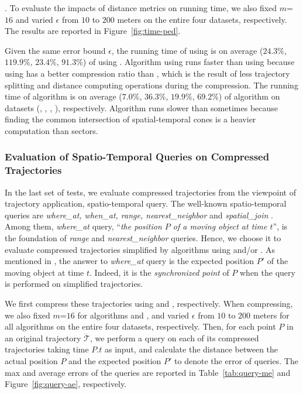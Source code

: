 {.
To evaluate the impacts of distance metrics on running time, we also fixed {$m$=$16$} and varied $\epsilon$ from $10$ to $200$ meters on the entire four datasets, respectively.
The results are reported in Figure~\ref{fig:time-ped}.

Given the same error bound $\epsilon$, the running time of \dpa  using \ped is on average
($24.3\%$, $119.9\%$, $23.4\%$, $91.3\%$) of \dpa  using \sed.
{Algorithm \dpa using \ped runs faster than using \sed because \dpa using \ped has a better compression ratio than \sed, which is the result of less trajectory splitting and distance computing operations during the compression.}
%
The running time of algorithm  is on average ($7.0\%$, $36.3\%$, $19.9\%$, $69.2\%$)
of algorithm \cist on datasets (\sercar, \geolife, \mopsi, \pricar), respectively.
{Algorithm \cist runs slower than  sometimes because
finding the common intersection of spatial-temporal cones is a heavier computation than sectors.
}


\subsubsection{{Evaluation of Spatio-Temporal Queries on Compressed Trajectories}}
{In the last set of tests, we evaluate compressed trajectories from the viewpoint of trajectory application, \ie spatio-temporal query. The well-known spatio-temporal queries are \emph{where\_at, when\_at, range, nearest\_neighbor} and \emph{spatial\_join} \cite{Cao:Spatio}. Among them, \emph{where\_at} query, \ie ``\emph{the position $P$ of a moving object at time $t$}'', is the foundation of \emph{range} and \emph{nearest\_neighbor} queries.}
{Hence, we choose it to evaluate compressed trajectories simplified by \lsa algorithms using \ped and/or \sed.
As mentioned in \cite{Cao:Spatio}, the answer to \emph{where\_at} query is the expected position $P'$ of the moving object at time $t$. Indeed, it is the \emph{synchronized point} of $P$ when the query is performed on simplified trajectories.}

{We first compress these trajectories using \ped and \sed, respectively. When compressing, we also fixed {$m$=$16$} for algorithms \cist and \cista,  and varied $\epsilon$ from $10$ to $200$ meters for all algorithms on the entire four datasets, respectively.}
{Then, for each point $P$ in an original trajectory $\dddot{\mathcal{T}}$, we perform a query on each of its compressed trajectories taking time $P.t$ as input, and calculate the distance between the actual position $P$ and the expected position $P'$ to denote the error of queries.
}
%
{The max and average errors of the queries are reported in Table~\ref{tab:query-me} and Figure~\ref{fig:query-ae}, respectively.}

}
